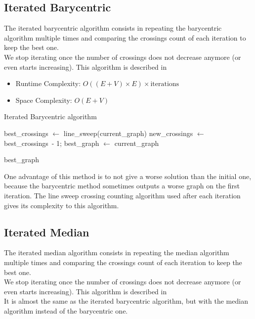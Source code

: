 \documentclass[a4paper]{article}
\begin{document}
\subsection{Iterated Barycentric}

The iterated barycentric algorithm consists in repeating the barycentric algorithm multiple times and comparing the crossings count of each iteration to keep the best one.\\
We stop iterating once the number of crossings does not decrease anymore (or even starts increasing). This algorithm is described in \cite{iterative1981}\\

\begin{itemize}
	\item Runtime Complexity: $O((E + V) \times E) \times \text{iterations}$
	\item Space Complexity: $O(E + V)$\\
\end{itemize}

\begin{algorithm}
	\caption{Iterated Barycentric algorithm}
	\DontPrintSemicolon
	\BlankLine

	best\_crossings $\gets$ line\_sweep(current\_graph)\;
	new\_crossings $\gets$ best\_crossings\ - 1;
	best\_graph $\gets$ current\_graph\;
	\BlankLine


	\Return best\_graph\;
\end{algorithm}

One advantage of this method is to not give a worse solution than the initial one, because the barycentric method sometimes outputs a worse graph on the first iteration.
The line sweep crossing counting algorithm used after each iteration gives its complexity to this algorithm.

\subsection{Iterated Median}


The iterated median algorithm consists in repeating the median algorithm multiple times and comparing the crossings count of each iteration to keep the best one.\\
We stop iterating once the number of crossings does not decrease anymore (or even starts increasing). This algorithm is described in \cite{iterative1981}\\
It is almost the same as the iterated barycentric algorithm, but with the median algorithm instead of the barycentric one.\\
\end{document}
